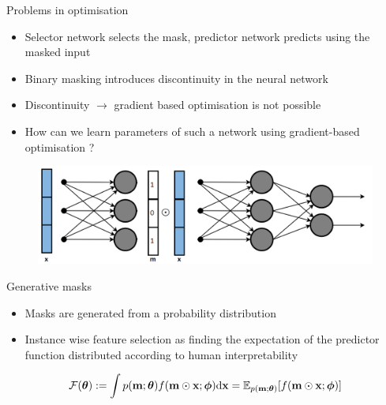 \documentclass[11pt,compress,t,notes=noshow, aspectratio=169, xcolor=table]{beamer}
\begin{document}
	
\begin{frame}{Problems in optimisation}
    \begin{itemize}
        \item Selector network selects the mask, predictor network predicts using the masked input
        \item Binary masking introduces discontinuity in the neural network
\item Discontinuity $\rightarrow$ gradient based optimisation is not possible
\bigskip
\item How can we learn parameters of such a network using gradient-based optimisation ?
    \end{itemize}
    \begin{figure}
        \centering
        \includegraphics[scale=.43]{bild16}
    \end{figure}
\end{frame}	

\begin{frame}{Generative masks}
    \begin{itemize}
        \item Masks are generated from a probability distribution
        \item Instance wise feature selection as finding the expectation of the predictor function
distributed according to human interpretability
    \end{itemize}
    \bigskip
   \begin{equation*}
             \centering
    \mathcal{F}(\boldsymbol{\theta}):=\int p(\mathbf{m} ; \boldsymbol{\theta}) f(\mathbf{m} \odot \mathbf{x} ; \boldsymbol{\phi}) \mathrm{d} \mathbf{x}=\mathbb{E}_{p(\mathbf{m} ; \boldsymbol{\theta})}[f(\mathbf{m} \odot \mathbf{x} ; \boldsymbol{\phi})]
\end{equation*}
    
    
    
\end{frame}
	
\end{document}
